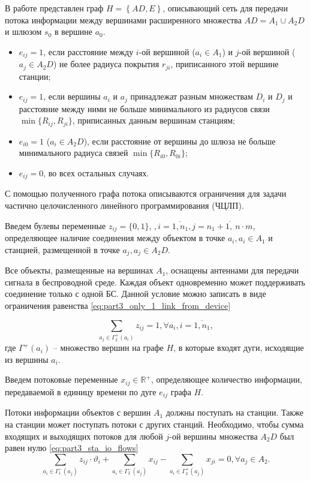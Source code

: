 В работе представлен граф $H=\left\{AD,E\right\}$, описывающий сеть для передачи потока информации между вершинами расширенного множества $AD=A_1 \cup A_2D$ и шлюзом $s_0$ в вершине $a_0$.

\begin{itemize}
    \item $e_{ij} = 1$, если расстояние между $i$-ой вершиной ($a_i \in A_1$) и $j$-ой вершиной ($a_j \in A_2D$) не более радиуса покрытия $r_{ji}$, приписанного этой вершине станции;
    \item $e_{ij} = 1$, если вершины $a_i$ и $a_j$ принадлежат разным множествам $D_i$ и $D_j$ и расстояние между ними не больше минимального из радиусов связи $\min\{R_{ij}, R_{ji}\}$, приписанных данным вершинам станциям;
    \item $e_{i0} = 1$ ($a_i \in A_2D$), если расстояние от вершины до шлюза не больше минимального радиуса связей $\min\{R_{i0}, R_{0i}\}$;
    \item $e_{ij} = 0$, во всех остальных случаях.
\end{itemize}

С помощью полученного графа потока описываются ограничения для задачи частично целочисленного линейного программирования (ЧЦЛП).

Введем булевы переменные $z_{ij} = \{0, 1\}$, $, i = \overline{1,n_1}, j = \overline{n_1+1, \ n \cdot m}$, определяющее наличие соединения между объектом в точке $a_i, a_i \in A_1$  и станцией, размещенной в точке $a_j, a_j \in A_2D$.


Все объекты, размещенные на вершинах $A_1$, оснащены антеннами для передачи сигнала в беспроводной среде. Каждая объект одновременно может поддерживать соединение только с одной БС. Данной условие можно записать в виде ограничения равенства \cref{eq:part3_only_1_link_from_device}


\begin{equation}\label{eq:part3_only_1_link_from_device}
    \sum_{a_j \in \Gamma_2^+(a_i)} z_{ij} = 1, \forall a_i, i =\overline{1, n_1},
\end{equation} 
где $\Gamma^+(a_i)$ -- множество вершин на графе $H$, в которые входят дуги, исходящие из вершины $a_i$.

Введем потоковые переменные $x_{ij} \in \mathbb{R}^+$, определяющее количество информации, передаваемой в единицу времени по дуге $e_{ij}$ графа $H$.

Потоки информации объектов с вершин $A_1$ должны поступать на станции. Также на станции может поступать потоки с других станций. Необходимо, чтобы сумма входящих и выходящих потоков для любой $j$-ой вершины множества $A_2D$ был равен нулю \cref{eq:part3_sta_io_flows} 
\begin{equation}\label{eq:part3_sta_io_flows} 
    \sum_{a_i \in \Gamma_1^-(a_j)} z_{ij} \cdot \vartheta_i + \sum_{a_i \in \Gamma_2^-(a_j)} x_{ij} -  \sum_{a_i \in \Gamma_2^+(a_j)} x_{ji} =0 ,\forall a_j \in A_2. 
\end{equation} 


